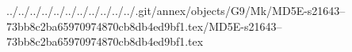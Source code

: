 ../../../../../../../../../../../.git/annex/objects/G9/Mk/MD5E-s21643--73bb8c2ba65970974870cb8db4ed9bf1.tex/MD5E-s21643--73bb8c2ba65970974870cb8db4ed9bf1.tex